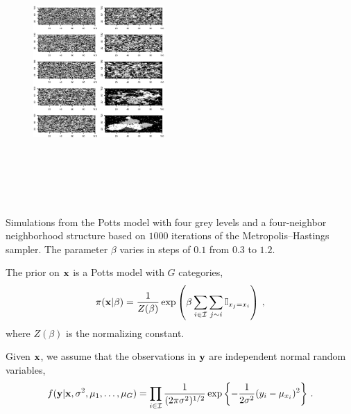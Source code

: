 \begin{slide}
\end{slide}\begin{slide}

\begin{figure}
\begin{center}
\includegraphics[width=5cm,height=10cm,angle=270]{figures/hmpotts.eps}
\end{center}
\end{figure}

\footnotesize 
Simulations from the Potts model with four grey levels and a four-neighbor neighborhood structure 
based on $1000$ iterations of the Metropolis--Hastings sampler. The parameter $\beta$ varies in steps of $0.1$ 
from $0.3$ to $1.2$.

\end{slide}\begin{slide}

The prior on $\mathbf{x}$ is a Potts model with $G$ categories,
$$
\pi(\mathbf{x}|\beta)=\frac{1}{Z(\beta)}\exp\left(\beta\sum_{i\in\mathcal{I}}\sum_{j \sim i}\mathbb{I}_{x_j=x_i}\right)\,,
$$
where $Z(\beta)$ is the normalizing constant.

\vs \pause Given $\mathbf{x}$, we assume that the observations in $\mathbf{y}$ are independent normal random variables,
$$
f(\mathbf{y}|\mathbf{x},\sigma^2,\mu_1,\ldots,\mu_G)=\prod_{i\in\mathcal{I}}
\frac{1}{(2\pi\sigma^2)^{1/2}} \exp\left\{ -\frac{1}{2\sigma^2}(y_i-\mu_{x_i})^2\right\} \,.
$$

\end{slide}\begin{slide}


\end{slide}
